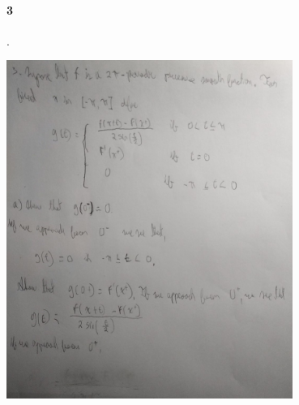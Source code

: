 \documentclass{article}
\begin{document}
\paragraph{3}.
\begin{center}
	\includegraphics[width=0.7\textwidth]{img/3-1-a.jpg}
\end{center}
\newpage
\end{document}
